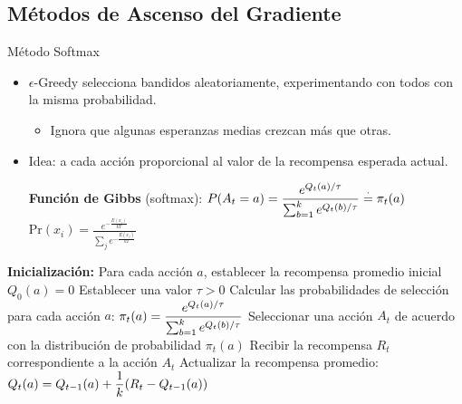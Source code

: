 \documentclass[10pt, envcountsect, handout, aspectratio=1610, hyperref={hypertexnames=true}]{beamer}
\begin{document}

\subsection{Métodos de Ascenso del Gradiente}




\begin{frame}{Método Softmax}

\begin{itemize}
\item $\epsilon$-Greedy selecciona bandidos aleatoriamente, experimentando con todos con la misma probabilidad.
    \begin{itemize}
    \item Ignora que algunas esperanzas medias crezcan más que  otras.
    \end{itemize}

\item Idea:  a cada acción proporcional al valor de la recompensa esperada actual.

\hfil \textbf{Función de Gibbs} (softmax): $\displaystyle P(A_t=a)= \frac{e^{Q_t(a) / \tau}}{\sum_{b=1}^{k} e^{Q_t(b)/ \tau}} \stackrel{\cdot}{=} \pi_t(a)$
\hfill
\(
\text{Pr}(x_i) = \frac{e^{-\frac{E(x_i)}{kT}}}{\sum_{j} e^{-\frac{E(x_j)}{kT}}}
\)


\end{itemize}




\begin{minipage}{.8\textwidth}
\begin{algoritmo}[H]	
\caption{\scriptsize{Algoritmo Softmax para el Problema del Bandido Multibrazo}}
\label{alg:Softmax} \footnotesize

\begin{algorithmic}[1]
    \STATE \textbf{Inicialización:}
    \STATE Para cada acción $a$, establecer la recompensa promedio inicial $Q_0(a) = 0$
    \STATE Establecer una valor $\tau > 0$
        	\STATE Calcular las probabilidades de selección para cada acción $a$:
        	\( \displaystyle
        	\pi_t(a) = \frac{e^{Q_t(a)/\tau}}{\sum_{b=1}^k e^{Q_t(b)/\tau}}
        	\)
		\ENDFOR
        \STATE Seleccionar una acción $A_t$ de acuerdo con la distribución de probabilidad $\pi_t(a)$
        \STATE Recibir la recompensa $R_t$ correspondiente a la acción $A_t$
        \STATE Actualizar la recompensa promedio:
        \( \displaystyle
        {Q}_t(a) = {Q}_{t-1}(a) + \frac{1}{k} (R_t - {Q}_{t-1}(a))
        \)
    \ENDFOR
\end{algorithmic}


\end{algoritmo}
\end{minipage}
\end{frame}
\end{document}
